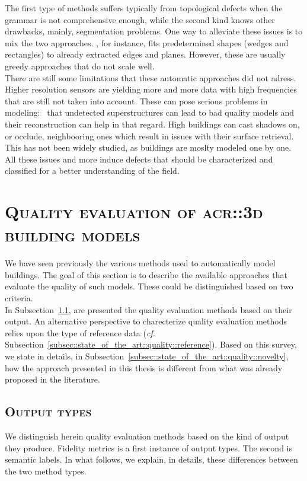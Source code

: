         The first type of methods suffers typically from topological defects when the grammar is not comprehensive enough, while the second kind knows other drawbacks, mainly, segmentation problems.
        One way to alleviate these issues is to mix the two approaches.
        \textcite{werner2002new}, for instance, fits predetermined shapes (wedges and rectangles) to already extracted edges and planes.
        However, these are usually greedy approaches that do not scale well.\\

        There are still some limitations that these automatic approaches did not adress.
        Higher resolution sensors are yielding more and more data with high frequencies that are still not taken into account.
        These can pose serious problems in modeling:~\textcite{bredif20073d} that undetected superstructures can lead to bad quality models and their reconstruction can help in that regard.
        High buildings can cast shadows on, or occlude, neighbooring ones which result in issues with their surface retrieval.
        This has not been widely studied\addref, as buildings are moslty modeled one by one.
        All these issues and more induce defects that should be characterized and classified for a better understanding of the field.

\section{\textsc{Quality evaluation of \texorpdfstring{\gls*{acr::3d}}{3D} building models}}
    \label{sec::state_of_the_art::quality}
    We have seen previously the various methods used to automatically model buildings.
    The goal of this section is to describe the available approaches that evaluate the quality of such models.
    These could be distinguished based on two criteria.\\
    In Subsection~\ref{subsec::state_of_the_art::quality::output}, are presented the quality evaluation methods based on their output.
    An alternative perspective to charecterize quality evaluation methods relies upon the type of reference data (\textit{cf.} Subsection~\ref{subsec::state_of_the_art::quality::reference}).
    Based on this survey, we state in details, in Subsection~\ref{subsec::state_of_the_art::quality::novelty}, how the approach presented in this thesis is different from what was already proposed in the literature.

    \subsection{\textsc{Output types}}
        \label{subsec::state_of_the_art::quality::output}
        We distinguish herein quality evaluation methods based on the kind of output they produce.
        Fidelity metrics is a first instance of output types.
        The second is semantic labels.
        In what follows, we explain, in details, these differences between the two method types.

